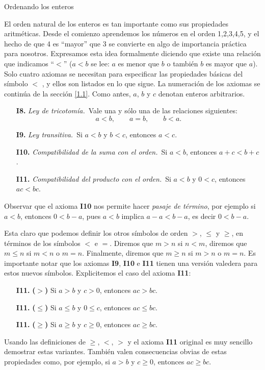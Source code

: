 \documentclass[11pt,spanish,makeidx]{amsbook}
\theoremstyle{definition}
\theoremstyle{remark}
\begin{document}
\begin{section}{Ordenando los enteros}\label{1.2}

El orden natural de los enteros es tan importante como sus propiedades aritméticas. Desde el comienzo aprendemos los números en el orden 1,2,3,4,5, y el hecho de que 4 es ``mayor'' que 3 se convierte en algo de importancia práctica para nosotros. Expresamos esta idea formalmente diciendo que existe una relación que indicamos ``$<$'' ($a < b$ se lee: $a$ es menor que $b$ o también $b$ es mayor que $a$). 
Solo cuatro axiomas se necesitan para especificar las propiedades básicas del símbolo $<$ , y ellos son listados en lo que sigue. La numeración de los axiomas se continúa de la sección \ref{1.1}. Como antes, $a$, $b$ y $c$ denotan enteros arbitrarios. 
\begin{enumerate}
\item[{\bf I8.}] {\em Ley de tricotomía.}\, Vale una y sólo una de las relaciones
siguientes:
$$
a<b, \qquad a = b, \qquad b < a.
$$
\item[{\bf I9.}] {\em Ley transitiva.}\, Si $a< b$ y $b < c$, entonces $a<c$.
\item[{\bf I10.}] {\em Compatibilidad de la suma con el orden.}\, Si $a < b$, entonces $a+c < b+c$. 
\item[{\bf I11.}] {\em Compatibilidad del producto con el orden.}\, Si $a< b$ y $0< c$, entonces $ac < bc$. 
\end{enumerate}


Observar que el axioma {\bf I10} nos permite hacer \textit{pasaje de término}, por ejemplo si $a < b$, entonces $0 < b -a$, pues $a < b$ implica $a - a < b - a$, es decir $0 < b -a$. 


Esta claro que podemos definir los otros símbolos de orden $>$, $\le$ y $\ge$, en términos de los símbolos $<$ e $=$. Diremos que $m>n$ si  $n<m$, diremos que $m \le n$ si $m<n$ o $m=n$. Finalmente, diremos que $m \ge n$ si $m > n$ o $m=n$.  Es importante notar que los  axiomas {\bf I9}, {\bf I10} e {\bf I11} tienen una versión valedera para estos nuevos símbolos. Explicitemos el caso  del axioma {\bf I11}:
\begin{enumerate}
\item[{\bf I11.}] {\bf ($>$)} Si $a > b$ y $c>0$, entonces $ac > bc$.
\item[{\bf I11.}] {\bf ($\le$)} Si $a \le b$ y $0 \le c$, entonces $ac \le bc$.
\item[{\bf I11.}] {\bf ($\ge$)} Si $a\ge b$ y $c\ge 0$, entonces $ac \ge bc$.
\end{enumerate}
Usando las definiciones de $\ge$, $<$, $>$ y el axioma {\bf I11} original es muy sencillo demostrar estas variantes. También valen consecuencias obvias de estas propiedades como, por ejemplo, si $a > b$ y $c \ge 0$, entonces $ac \ge bc$. 



\end{section}
\end{document}
